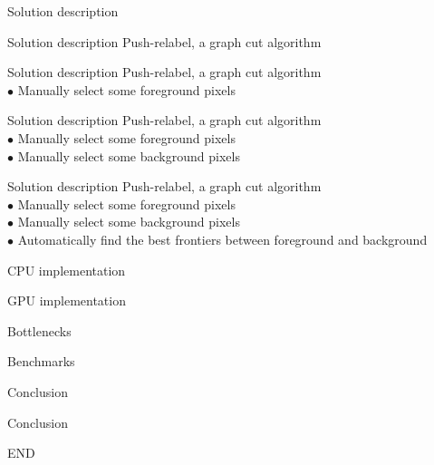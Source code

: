 \documentclass[10pt]{beamer}
\begin{document}
\begin{frame}{Solution description}
\end{frame}

\begin{frame}{Solution description}
Push-relabel, a graph cut algorithm
\end{frame}

\begin{frame}{Solution description}
Push-relabel, a graph cut algorithm\\
$\bullet$ Manually select some foreground pixels
\end{frame}

\begin{frame}{Solution description}
Push-relabel, a graph cut algorithm\\
$\bullet$ Manually select some foreground pixels\\
$\bullet$ Manually select some background pixels
\end{frame}

\begin{frame}{Solution description}
Push-relabel, a graph cut algorithm\\
$\bullet$ Manually select some foreground pixels\\
$\bullet$ Manually select some background pixels\\
$\bullet$ Automatically find the best frontiers between foreground and
background
\end{frame}

\begin{frame}{CPU implementation}
\end{frame}

\begin{frame}{GPU implementation}
\end{frame}

\begin{frame}{Bottlenecks}
\end{frame}

\begin{frame}{Benchmarks}
\end{frame}

\begin{frame}{Conclusion}
\end{frame}

\begin{frame}{Conclusion}
\begin{center}
    END
\end{center}
\end{frame}
\end{document}
